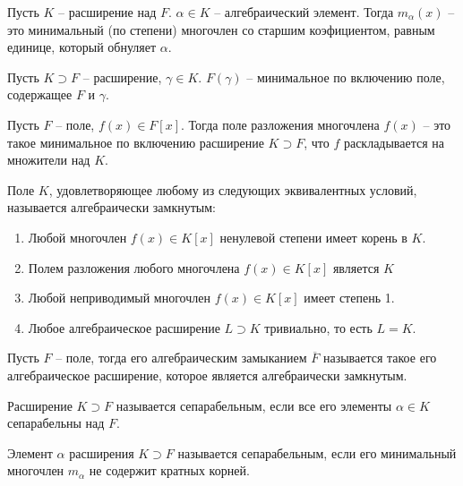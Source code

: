 \documentclass{article}
\begin{document}
\begin{definition}
    Пусть $K$ -- расширение над $F$. $\alpha \in K$ -- алгебраический элемент. Тогда $m_{\alpha}(x)$ -- это минимальный
    (по степени) многочлен со старшим коэфициентом, равным единице, который обнуляет $\alpha$.
\end{definition}

\begin{definition}
    Пусть $K \supset F$ -- расширение, $\gamma \in K$. $F(\gamma)$ -- минимальное по включению поле, содержащее $F$ и
    $\gamma$.
\end{definition}

\begin{definition}
    Пусть $F$ -- поле, $f(x) \in F[x]$. Тогда поле разложения многочлена $f(x)$ -- это такое минимальное по включению
    расширение $K \supset F$, что $f$ раскладывается на множители над $K$.
\end{definition}

\begin{definition}
    Поле $K$, удовлетворяющее любому из следующих эквивалентных условий, называется алгебраически замкнутым:
    \begin{enumerate}
        \item Любой многочлен $f(x) \in K[x]$ ненулевой степени имеет корень в $K$.
        \item Полем разложения любого многочлена $f(x) \in K[x]$ является $K$
        \item Любой неприводимый многочлен $f(x) \in K[x]$ имеет степень 1.
        \item Любое алгебраическое расширение $L \supset K$ тривиально, то есть $L = K$.
    \end{enumerate}
\end{definition}

\begin{definition}
    Пусть $F$ -- поле, тогда его алгебраическим замыканием $\overline F$ называется такое его алгебраическое расширение,
    которое является алгебраически замкнутым.
\end{definition}

\begin{definition}
    Расширение $K \supset F$ называется сепарабельным, если все его элементы $\alpha \in K$ сепарабельны над $F$.
\end{definition}

\begin{definition}
    Элемент $\alpha$ расширения $K \supset F$ называется сепарабельным, если его минимальный многочлен $m_{\alpha}$ не
    содержит кратных корней.
\end{definition}
\end{document}
